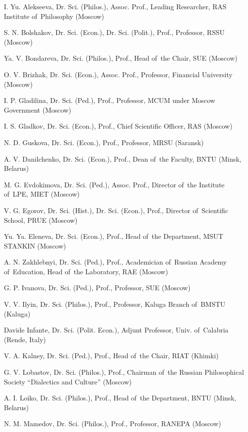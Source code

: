 \begin{otherlanguage}{english}
\begin{multicols}{2}
\begin{flushleft}
\noindent I. Yu. Alekseeva, Dr. Sci. (Philos.), Assoc. Prof., Leading Researcher, RAS Institute of Philosophy (Moscow)

\noindent S. N. Bolshakov, Dr. Sci. (Econ.), Dr. Sci. (Polit.), Prof., Professor, RSSU (Moscow)

\noindent Ya. V. Bondareva, Dr. Sci. (Philos.), Prof., Head of the Chair, SUE (Moscow)

\noindent O. V. Brizhak, Dr. Sci. (Econ.), Assoc. Prof., Professor, Financial University (Moscow)

\noindent I. P. Gladilina, Dr. Sci. (Ped.), Prof., Professor, MCUM under Moscow Government (Moscow)

\noindent I. S. Gladkov, Dr. Sci. (Econ.), Prof., Chief Scientific Officer, RAS (Moscow)

\noindent N. D. Guskova, Dr. Sci. (Econ.), Prof., Professor, MRSU (Saransk)

\noindent A. V. Danilchenko, Dr. Sci. (Econ.), Prof., Dean of the Faculty, BNTU (Minsk, Belarus)

\noindent M. G. Evdokimova, Dr. Sci. (Ped.), Assoc. Prof., Director of the Institute of LPE, MIET (Moscow)

\noindent V. G. Egorov, Dr. Sci. (Hist.), Dr. Sci. (Econ.), Prof., Director of Scientific School, PRUE (Moscow)

\noindent Yu. Ya. Eleneva, Dr. Sci. (Econ.), Prof., Head of the Department, MSUT STANKIN (Moscow)

\noindent A. N. Zakhlebnyi, Dr. Sci. (Ped.), Prof., Academician of Russian Academy of Education, Head of the Laboratory, RAE (Moscow)

\noindent G. P. Ivanova, Dr. Sci. (Ped.), Prof., Professor, SUE (Moscow)

\noindent V. V. Ilyin, Dr. Sci. (Philos.), Prof., Professor, Kaluga Branch of BMSTU (Kaluga)

\noindent Davide Infante, Dr. Sci. (Polit. Econ.), Adjunt Professor, Univ. of Calabria (Rende, Italy)

\noindent V. A. Kalney, Dr. Sci. (Ped.), Prof., Head of the Chair, RIAT (Khimki)

\noindent G. V. Lobastov, Dr. Sci. (Philos.), Prof., Chairman of the Russian Philosophical Society “Dialectics and Culture” (Moscow)

\noindent A. I. Loiko, Dr. Sci. (Philos.), Prof., Head of the Department, BNTU (Minsk, Belarus)

\noindent N. M. Mamedov, Dr. Sci. (Philos.), Prof., Professor, RANEPA (Moscow)


\end{flushleft}
\end{multicols}
\end{otherlanguage}
